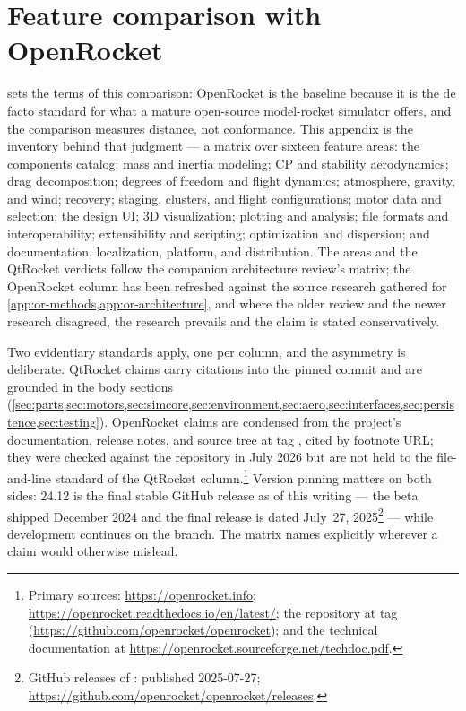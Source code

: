 \section{Feature comparison with OpenRocket}\label{app:or-features}

 sets the terms of this comparison: OpenRocket is the baseline because it
is the de facto standard for what a mature open-source model-rocket simulator offers, and the
comparison measures distance, not conformance. This appendix is the inventory behind that
judgment --- a matrix over sixteen feature areas: the components catalog; mass and inertia
modeling; CP and stability aerodynamics; drag decomposition; degrees of freedom and flight
dynamics; atmosphere, gravity, and wind; recovery; staging, clusters, and flight configurations;
motor data and selection; the design UI; 3D visualization; plotting and analysis; file formats
and interoperability; extensibility and scripting; optimization and dispersion; and
documentation, localization, platform, and distribution. The areas and the QtRocket verdicts
follow the companion architecture review's matrix; the OpenRocket column has been refreshed
against the source research gathered for \cref{app:or-methods,app:or-architecture}, and where
the older review and the newer research disagreed, the research prevails and the claim is stated
conservatively.

Two evidentiary standards apply, one per column, and the asymmetry is deliberate. QtRocket
claims carry  citations into the pinned commit  and are grounded
in the body sections
(\cref{sec:parts,sec:motors,sec:simcore,sec:environment,sec:aero,sec:interfaces,sec:persistence,sec:testing}).
OpenRocket claims are condensed from the project's documentation, release notes, and source tree
at tag , cited by footnote URL; they were checked against the repository in
July 2026 but are not held to the file-and-line standard of the QtRocket
column.\footnote{Primary sources: \url{https://openrocket.info};
\url{https://openrocket.readthedocs.io/en/latest/}; the  repository
at tag  (\url{https://github.com/openrocket/openrocket}); and the technical
documentation at \url{https://openrocket.sourceforge.net/techdoc.pdf}.} Version pinning matters
on both sides: 24.12 is the final stable GitHub release as of this writing --- the beta shipped
December 2024 and the final release is dated July~27, 2025\footnote{GitHub releases of
:  published 2025-07-27;
\url{https://github.com/openrocket/openrocket/releases}.} --- while development continues on the
 branch. The matrix names  explicitly wherever a claim would
otherwise mislead.

